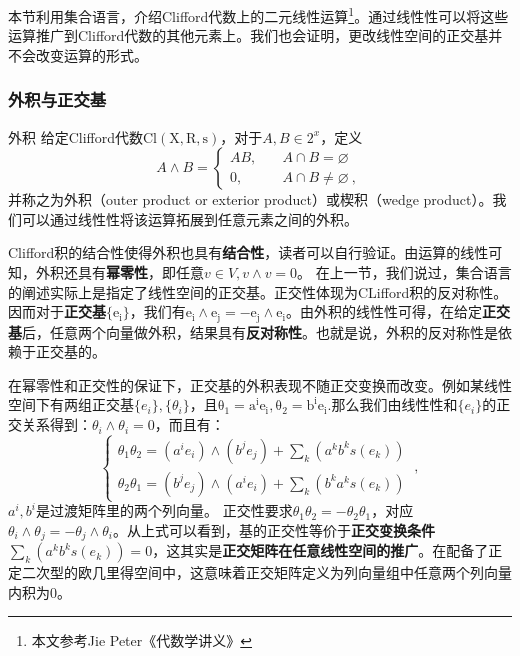 



本节利用集合语言，介绍Clifford代数上的二元线性运算\footnote{本文参考Jie Peter《代数学讲义》}。通过线性性可以将这些运算推广到Clifford代数的其他元素上。我们也会证明，更改线性空间的正交基并不会改变运算的形式。
\subsubsection{外积与正交基}
\begin{definition}{外积}
给定Clifford代数$\mathrm {Cl(X,R,s)}$，对于$A,B\in 2^x$，定义
\begin{equation}
A \wedge B=\left\{\begin{aligned}
A B,\quad& A \cap B=\varnothing \\
0,\quad& A \cap B \neq \varnothing~,
\end{aligned}\right.
\end{equation}
并称之为外积（outer product or exterior product）或楔积（wedge product）。我们可以通过线性性将该运算拓展到任意元素之间的外积。
\end{definition}


Clifford积的结合性使得外积也具有\textbf{结合性}，读者可以自行验证。由运算的线性可知，外积还具有\textbf{幂零性}，即任意$v\in V,v\wedge v=0$。
在上一节，我们说过，集合语言的阐述实际上是指定了线性空间的正交基。正交性体现为CLifford积的反对称性。因而对于\textbf{正交基}$\{\mathrm {e_i}\}$，我们有$\mathrm{e_i\wedge e_j=-e_j\wedge e_i}$。由外积的线性性可得，在给定\textbf{正交基}后，任意两个向量做外积，结果具有\textbf{反对称性}。也就是说，外积的反对称性是依赖于正交基的。


在幂零性和正交性的保证下，正交基的外积表现不随正交变换而改变。例如某线性空间下有两组正交基$\{e_i\},\{\theta_i\}$，且$\mathrm {\theta_1=a^i e_i,\theta_2=b^i e_i}$.那么我们由线性性和$\{e_i\}$的正交关系得到：$\theta_i\wedge\theta_i=0$，而且有：
\begin{equation}
\left\{\begin{array}{l}
\theta_1 \theta_2=\left(a^i e_i\right) \wedge\left(b^j e_j\right)+\sum_k\left(a^k b^k s(e_k)\right) \\
\theta_2 \theta_1=\left(b^j e_j\right) \wedge\left(a^i e_i\right)+\sum_k\left(b^k a^k s(e_k)\right)
\end{array}\right.~,
\end{equation}
$a^i,b^i$是过渡矩阵里的两个列向量。
正交性要求$\theta_1\theta_2=-\theta_2\theta_1$，对应$\theta_i\wedge\theta_j=-\theta_j\wedge\theta_i$。从上式可以看到，基的正交性等价于\textbf{正交变换条件}$\sum_k(a^k b^k s(e_k))=0$，这其实是\textbf{正交矩阵在任意线性空间的推广}。在配备了正定二次型的欧几里得空间中，这意味着正交矩阵定义为列向量组中任意两个列向量内积为$0$。
